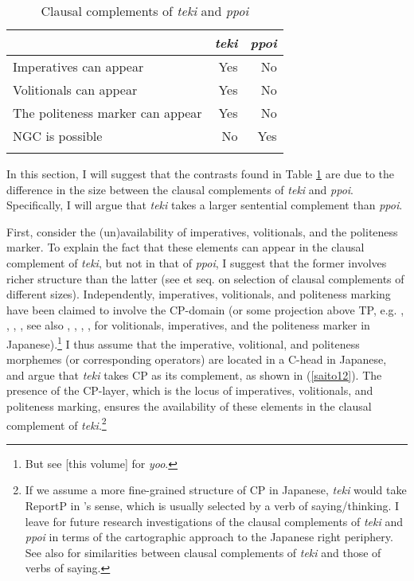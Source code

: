 \documentclass[output=paper]{langscibook}
\begin{document}
\begin{table}
\caption{Clausal complements of \emph{teki} and \emph{ppoi}}
\label{saitotab1}
 \begin{tabular}{l rr}
  \lsptoprule
  \multicolumn{1}{r@{}}{Clausal complements of:}     &     \emph{teki} & \emph{ppoi}\\
  \midrule
  Imperatives can appear  &   Yes  &    No     \\
  Volitionals can appear &   Yes &   No      \\
  The politeness marker can appear & Yes & No \\
  NGC is possible & No & Yes\\
  \lspbottomrule
 \end{tabular}
\end{table}

In this section, I will suggest that the contrasts found in Table \ref{saitotab1} are due to the difference in the size between the clausal complements of \emph{teki} and \emph{ppoi}. Specifically, I will argue that \emph{teki} takes a larger sentential complement than \emph{ppoi}. 

First, consider the (un)availability of imperatives, volitionals, and the politeness marker. To explain the fact that these elements can appear in the clausal complement of \emph{teki}, but not in that of \emph{ppoi}, I suggest that the former involves richer structure than the latter (see \citealt{wurmbrand2001} et seq. on selection of clausal complements of different sizes). Independently, imperatives, volitionals, and politeness marking have been claimed to involve the CP-domain (or some projection above TP, e.g. \citealt{rizzi1997}, \citealt{Han1998}, \citealt{cinque1999}, \citealt{Haegeman2006}, see also \citealt{Ueda2007,Ueda2007}, \citealt{Endo2009}, \citealt{Hasegawa2010}, \citealt{miyagawa2012a}, \citealt{Yoshimoto2017} for volitionals, imperatives, and the politeness marker in Japanese).\footnote{But see \citealt{shimamura2021} [this volume] for \emph{yoo}.} I thus assume that the imperative, volitional, and politeness morphemes (or corresponding operators) are located in a C-head in Japanese, and argue that \emph{teki} takes CP as its complement, as shown in (\ref{saito12}). The presence of the CP-layer, which is the locus of imperatives, volitionals, and politeness marking, ensures the availability of these elements in the clausal complement of \emph{teki}.\footnote{If we assume a more fine-grained structure of CP in Japanese, \emph{teki} would take ReportP in \citeauthor{Saito2012}'s \citeyear{Saito2012} sense, which is usually selected by a verb of saying/thinking. I leave for future research investigations of the clausal complements of \emph{teki} and \emph{ppoi} in terms of the cartographic approach to the Japanese right periphery. See also \citet{Saito2017} for similarities between clausal complements of \emph{teki} and those of verbs of saying.}
\end{document}
